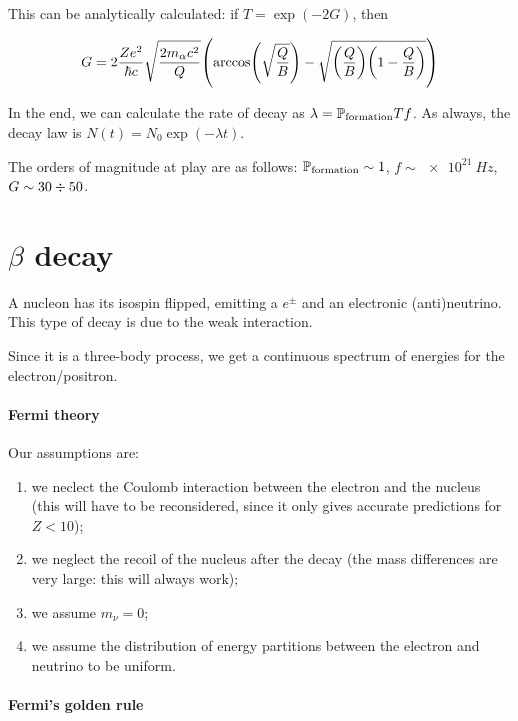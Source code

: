 \documentclass[main.tex]{subfiles}
\begin{document}
This can be analytically calculated: if \(T = \exp(-2G) \), then

\begin{equation}
G = 2 \frac{Ze^2}{\hbar c} \sqrt{\frac{2m_\alpha c^2}{Q}}
\qty(\arccos(\sqrt{\frac{Q}{B}} ) - \sqrt{\qty(\frac{Q}{B}) \qty(1 - \frac{Q}{B})} )
\end{equation}

In the end, we can calculate the rate of decay as \(\lambda = \P _ \text{formation} T f\). As always, the decay law is \(N(t) = N_0 \exp(-\lambda t) \).

The orders of magnitude at play are as follows: \(\P _{\text{formation}} \sim 1 \), \(f \sim \SI{e21}{Hz} \), \(G \sim 30 \divisionsymbol 50\).

\section{\(\beta\) decay}

A nucleon has its isospin flipped, emitting a \(e^{\pm}\) and an electronic (anti)neutrino. This type of decay is due to the weak interaction.

Since it is a three-body process, we get a continuous spectrum of energies for the electron/positron.

\paragraph{Fermi theory}

Our assumptions are:

\begin{enumerate}
    \item we neclect the Coulomb interaction between the electron and the nucleus (this will have to be reconsidered, since it only gives accurate predictions for \(Z<10\));
    \item we neglect the recoil of the nucleus after the decay (the mass differences are very large: this will always work);
    \item we assume \(m_\nu = 0\); \label{item:beta-null-mass-assumption}
    \item we assume the distribution of energy partitions between the electron and neutrino to be uniform.
\end{enumerate}

\paragraph{Fermi's golden rule}
\end{document}
